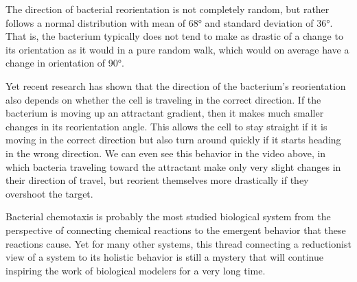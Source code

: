 The direction of bacterial reorientation is not completely random, but rather follows a normal distribution with mean of 68° and standard deviation of 36°. That is, the bacterium typically does not tend to make as drastic of a change to its orientation as it would in a pure random walk, which would on average have a change in orientation of 90°.

Yet recent research has shown that the direction of the bacterium's reorientation also depends on whether the cell is traveling in the correct direction. If the bacterium is moving up an attractant gradient, then it makes much smaller changes in its reorientation angle. This allows the cell to stay straight if it is moving in the correct direction but also turn around quickly if it starts heading in the wrong direction. We can even see this behavior in the video above, in which bacteria traveling toward the attractant make only very slight changes in their direction of travel, but reorient themselves more drastically if they overshoot the target.

Bacterial chemotaxis is probably the most studied biological system from the perspective of connecting chemical reactions to the emergent behavior that these reactions cause. Yet for many other systems, this thread connecting a reductionist view of a system to its holistic behavior is still a mystery that will continue inspiring the work of biological modelers for a very long time.


 

